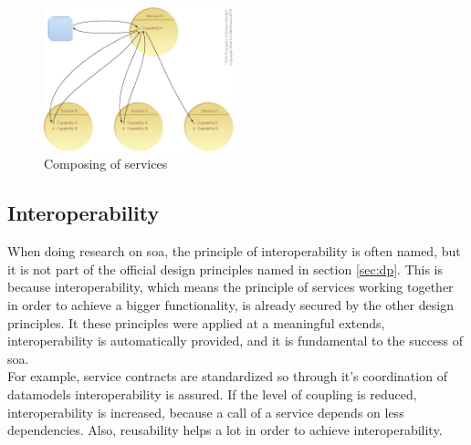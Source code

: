 \documentclass[12pt]{article}
\begin{document}
\begin{figure}[here!]
	\centering
	\includegraphics[width=0.49\textwidth]{images/serivceorientationdotcom}
	\caption{Composing of services \cite{photos}}
	\label{fig:goalssoa}
	\end{figure}
\FloatBarrier
 \noindent
\newpage
\subsection{Interoperability}
When doing research on \gls{soa}, the principle of interoperability is often named, but it is not part of the official design principles named in section \ref{sec:dp}. This is because interoperability, which means the principle of services working together in order to achieve a bigger functionality, is already secured by the other design principles. It these principles were applied at a meaningful extends, interoperability is automatically provided, and it is fundamental to the success of \gls{soa}.\\
For example, service contracts are standardized so through it's coordination of datamodels interoperability is assured. If the level of coupling is reduced, interoperability is increased, because a call of a service depends on less dependencies. Also, reusability helps a lot in order to achieve interoperability. \cite[page 89-90]{te}
\end{document}

